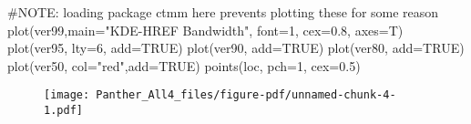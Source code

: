 \documentclass[
  letterpaper,
]{book}
\newenvironment{Shaded}{\begin{snugshade}}{\end{snugshade}}
\newcommand{\AttributeTok}[1]{\textcolor[rgb]{0.40,0.45,0.13}{#1}}
\newcommand{\CommentTok}[1]{\textcolor[rgb]{0.37,0.37,0.37}{#1}}
\newcommand{\ConstantTok}[1]{\textcolor[rgb]{0.56,0.35,0.01}{#1}}
\newcommand{\DecValTok}[1]{\textcolor[rgb]{0.68,0.00,0.00}{#1}}
\newcommand{\FloatTok}[1]{\textcolor[rgb]{0.68,0.00,0.00}{#1}}
\newcommand{\FunctionTok}[1]{\textcolor[rgb]{0.28,0.35,0.67}{#1}}
\newcommand{\NormalTok}[1]{\textcolor[rgb]{0.00,0.23,0.31}{#1}}
\newcommand{\StringTok}[1]{\textcolor[rgb]{0.13,0.47,0.30}{#1}}
\begin{document}
\begin{Shaded}
\begin{Highlighting}[]
\CommentTok{\#NOTE: loading package ctmm here prevents plotting these for some reason }
\FunctionTok{plot}\NormalTok{(ver99,}\AttributeTok{main=}\StringTok{"KDE{-}HREF Bandwidth"}\NormalTok{, }\AttributeTok{font=}\DecValTok{1}\NormalTok{, }\AttributeTok{cex=}\FloatTok{0.8}\NormalTok{, }\AttributeTok{axes=}\NormalTok{T)}
\FunctionTok{plot}\NormalTok{(ver95, }\AttributeTok{lty=}\DecValTok{6}\NormalTok{, }\AttributeTok{add=}\ConstantTok{TRUE}\NormalTok{)}
\FunctionTok{plot}\NormalTok{(ver90, }\AttributeTok{add=}\ConstantTok{TRUE}\NormalTok{)}
\FunctionTok{plot}\NormalTok{(ver80, }\AttributeTok{add=}\ConstantTok{TRUE}\NormalTok{)}
\FunctionTok{plot}\NormalTok{(ver50, }\AttributeTok{col=}\StringTok{"red"}\NormalTok{,}\AttributeTok{add=}\ConstantTok{TRUE}\NormalTok{)}
\FunctionTok{points}\NormalTok{(loc, }\AttributeTok{pch=}\DecValTok{1}\NormalTok{, }\AttributeTok{cex=}\FloatTok{0.5}\NormalTok{)}
\end{Highlighting}
\end{Shaded}

\begin{figure}[H]

{\centering \texttt{[image: Panther\_All4\_files/figure-pdf/unnamed-chunk-4-1.pdf]}

}

\end{figure}
\end{document}
